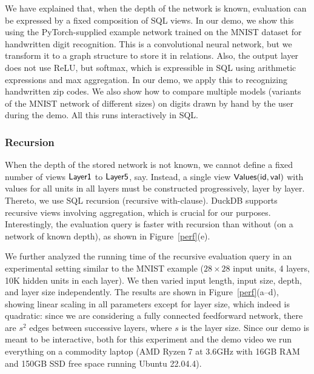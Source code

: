\documentclass{article}
\begin{document}
We have explained that, when the depth of the network is known,
evaluation can be expressed by a fixed composition of SQL views.
In our demo, we show this using the PyTorch-supplied example
network trained on the MNIST dataset for handwritten digit
recognition.  This is a convolutional neural network, but we
transform it to a graph structure to store it in relations.  Also,
the output layer does not use ReLU, but softmax, which is
expressible in SQL using arithmetic expressions and max
aggregation.  In our demo, we apply this to recognizing
handwritten zip codes.  We also show how to compare multiple
models (variants of the MNIST network of different sizes) on
digits drawn by hand by the user during the demo.  All this runs
interactively in SQL.

\subsubsection*{Recursion} When the depth of the stored network
is not known, we cannot define a fixed number of views $\sf
Layer1$ to $\sf Layer5$, say.  Instead, a single view $\sf
Values(id,val)$ with values for all units in all layers must be
constructed progressively, layer by layer.  Thereto, we use SQL
recursion (recursive with-clause).  DuckDB supports recursive
views involving aggregation, which is crucial for our purposes.
Interestingly, the evaluation query is faster with recursion than
without (on a network of known depth), as shown in
Figure~\ref{perf}(e).

We further analyzed the running time of the recursive evaluation
query in an experimental setting similar to the MNIST example
($28\times 28$ input units, 4 layers, 10K hidden units in each
layer).  We then varied input length, input size, depth, and
layer size independently.  The results are shown in
Figure~\ref{perf}(a--d), showing linear scaling in all parameters
except for layer size, which indeed is quadratic: since we are
considering a fully connected feedforward network, there are
$s^2$ edges between successive layers, where $s$ is the layer
size.  Since our demo is meant to be interactive, both for this
experiment and the demo video we run everything on a commodity laptop (AMD
Ryzen 7 at 3.6GHz with 16GB RAM and 150GB SSD free space running Ubuntu
22.04.4).
\end{document}
